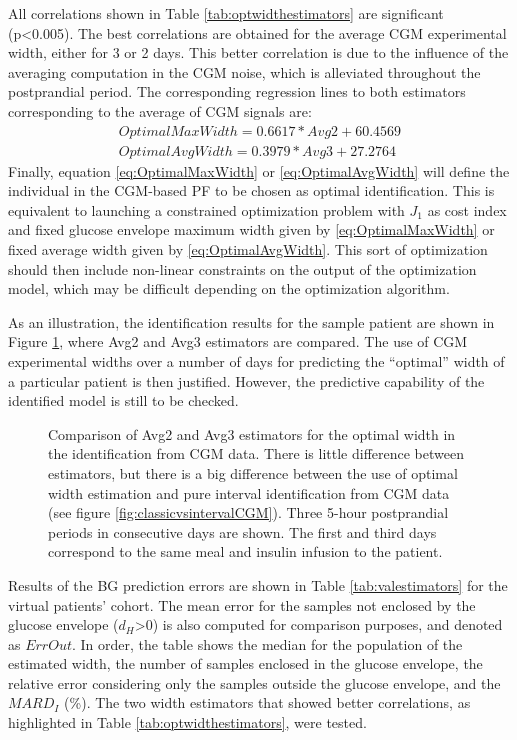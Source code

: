 All correlations shown in Table \ref{tab:optwidthestimators} are significant (p<0.005). The best correlations are obtained for the average CGM experimental width, either for 3 or 2 days. This better correlation is due to the influence of the averaging computation in the CGM noise, which is alleviated throughout the postprandial period. The corresponding regression lines to both estimators corresponding to the average of CGM signals are:
\begin{align}
	OptimalMaxWidth =0.6617 \ast Avg2+60.4569 \label{eq:OptimalMaxWidth} \\
	OptimalAvgWidth =0.3979 \ast Avg3+27.2764 \label{eq:OptimalAvgWidth}
\end{align}
Finally, equation \eqref{eq:OptimalMaxWidth} or \eqref{eq:OptimalAvgWidth} will define the individual in the CGM-based PF to be chosen as optimal identification. This is equivalent to launching a constrained optimization problem with $J_1$ as cost index and fixed glucose envelope maximum width given by \eqref{eq:OptimalMaxWidth} or fixed average width given by \eqref{eq:OptimalAvgWidth}. This sort of optimization should then include non-linear constraints on the output of the optimization model, which may be difficult depending on the optimization algorithm.

As an illustration, the identification results for the sample patient are shown in Figure \ref{fig:comparewidthestimators}, where Avg2 and Avg3 estimators are compared. The use of CGM experimental widths over a number of days for predicting the ``optimal'' width of a particular patient is then justified. However, the predictive capability of the identified model is still to be checked. 

\begin{figure}[hbtp]
\centering
{}\caption{Comparison of Avg2 and Avg3 estimators for the optimal width in the identification from CGM data. There is little difference between estimators, but there is a big difference between the use of optimal width estimation and pure interval identification from CGM data (see figure \ref{fig:classicvsintervalCGM}). Three 5-hour postprandial periods in consecutive days are shown. The first and third days correspond to the same meal and insulin infusion to the patient.}
\label{fig:comparewidthestimators}
\end{figure}

Results of the BG prediction errors are shown in Table \ref{tab:valestimators} for the virtual patients' cohort. The mean error for the samples not enclosed by the glucose envelope ($d_H$>0) is also computed for comparison purposes, and denoted as $ErrOut$. In order, the table shows the median for the population of the estimated width, the number of samples enclosed in the glucose envelope, the relative error considering only the samples outside the glucose envelope, and the $MARD_I$ (\%). The two width estimators that showed better correlations, as highlighted in Table \ref{tab:optwidthestimators}, were tested.


